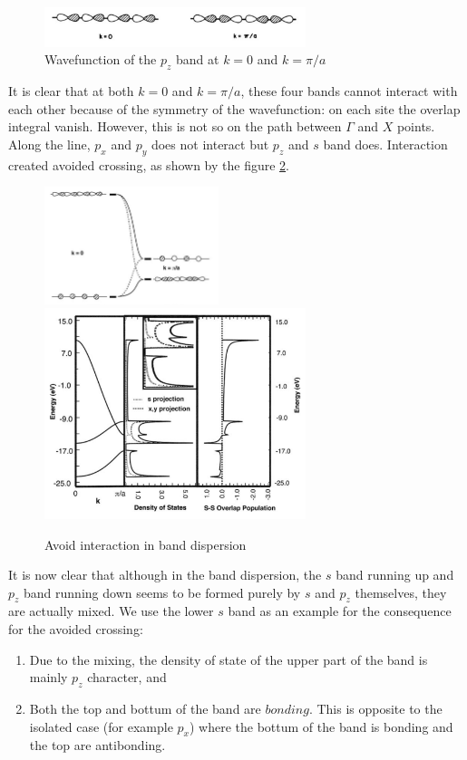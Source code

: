 \documentclass{article}
\begin{document}
\begin{figure}[h!]
    \centering
    \includegraphics[width=3in]{F_pz.png}
    \caption{Wavefunction of the $p_z$ band at $k=0$ and $k=\pi/a$}
    \label{F:pz}
\end{figure}

It is clear that at both $k=0$ and $k=\pi/a$, these four bands cannot interact with each other 
because of the symmetry of the wavefunction: on each site the overlap integral vanish. However, 
this is not so on the path between $\Gamma$ and $X$ points. Along the line, $p_x$ and $p_y$ 
does not interact but $p_z$ and $s$ band does. Interaction created avoided crossing, as shown 
by the figure \ref{F:avoid_interaction}.

\begin{figure}[h!]
    \centering
    \includegraphics[width=2in]{F_avoid_interaction_spz.png}
    \includegraphics[width=3in]{F_avoid_interaction_dispersion.png}
    \caption{Avoid interaction in band dispersion}
    \label{F:avoid_interaction}
\end{figure}

It is now clear that although in the band dispersion, the $s$ band running up and $p_z$ band 
running down seems to be formed purely by $s$ and $p_z$ themselves, they are actually mixed. 
We use the lower $s$ band as an example for the consequence for the avoided crossing:
\begin{enumerate}
    \item Due to the mixing, the density of state of the upper part of the band is mainly $p_z$ character, and 
    \item Both the top and bottum of the band are $bonding$. This is opposite to the isolated case (for example $p_x$) where 
          the bottum of the band is bonding and the top are antibonding. 
\end{enumerate}
\end{document}
